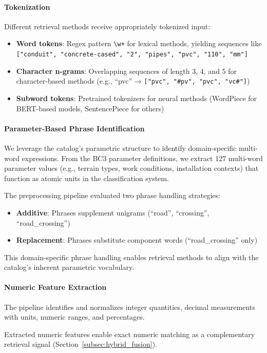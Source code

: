 \documentclass[preprint,review,12pt]{elsarticle}
\begin{document}
\paragraph{Tokenization}
Different retrieval methods receive appropriately tokenized input:
\begin{itemize}
    \item \textbf{Word tokens}: Regex pattern \texttt{\textbackslash w+} for lexical methods, yielding sequences like \texttt{["conduit", "concrete-cased", "2", "pipes", "pvc", "110", "mm"]}
    \item \textbf{Character n-grams}: Overlapping sequences of length 3, 4, and 5 for character-based methods (e.g., ``pvc'' → \texttt{["pvc", "\#pv", "pvc", "vc\#"]})
    \item \textbf{Subword tokens}: Pretrained tokenizers for neural methods (WordPiece for BERT-based models, SentencePiece for others)
\end{itemize}

\paragraph{Parameter-Based Phrase Identification}
We leverage the catalog's parametric structure to identify domain-specific multi-word expressions. From the BC3 parameter definitions, we extract 127 multi-word parameter values (e.g., terrain types, work conditions, installation contexts) that function as atomic units in the classification system.

The preprocessing pipeline evaluated two phrase handling strategies:
\begin{itemize}
    \item \textbf{Additive}: Phrases supplement unigrams (``road'', ``crossing'', ``road\_crossing'')
    \item \textbf{Replacement}: Phrases substitute component words (``road\_crossing'' only)
\end{itemize}

This domain-specific phrase handling enables retrieval methods to align with the catalog's inherent parametric vocabulary.

\paragraph{Numeric Feature Extraction}
The pipeline identifies and normalizes integer quantities, decimal measurements with units, numeric ranges, and percentages.

Extracted numeric features enable exact numeric matching as a complementary retrieval signal (Section~\ref{subsec:hybrid_fusion}).
\end{document}
